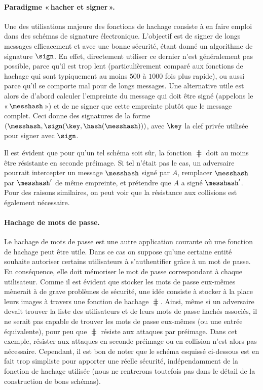 \paragraph{Paradigme «\,hacher et signer\,».}
Une des utilisations majeure des fonctions de hachage consiste à en faire emploi dans des schémas de signature électronique.
L'objectif est de signer de longs messages efficacement et avec une bonne sécurité, étant donné un algorithme de signature
$\sign$. En effet, directement utiliser ce dernier n'est généralement pas possible, parce qu'il est trop lent (particulièrement
comparé aux fonctions de hachage qui sont typiquement au moins $500$ à $1000$ fois plus rapide), ou aussi parce qu'il se comporte mal
pour de longs messages. Une alternative utile est alors de d'abord calculer l'empreinte du message
qui doit être signé
(appelons le «\,$\messhash$\,») et de ne signer que cette empreinte plutôt que le message complet.
Ceci donne des signatures de la forme $(\messhash, \sign(\key,\hash(\messhash)))$, avec $\key$ la clef privée utilisée pour signer avec $\sign$. 

Il est évident que pour qu'un tel schéma soit sûr, la fonction $\hash$ doit au moins être résistante en seconde préimage. Si tel n'était pas le cas, un adversaire
pourrait intercepter un message $\messhash$ signé par $A$, remplacer $\messhash$ par $\messhash'$ de même empreinte, et prétendre que $A$ a signé $\messhash'$.
Pour des raisons similaires, on peut voir que la résistance aux collisions est également nécessaire.

\paragraph{Hachage de mots de passe.} Le hachage de mots de passe est une autre application courante où une fonction
de hachage peut être utile. Dans ce cas
on suppose qu'une certaine entité souhaite autoriser certains utilisateurs à s'authentifier grâce à un mot de passe.
En conséquence, elle doit mémoriser le mot de passe correspondant à chaque utilisateur. Comme il est évident que stocker les mots
de passe eux-mêmes mènerait à de grave problèmes de sécurité, une idée consiste à stocker à la place leurs images à travers une fonction
de hachage $\hash$. Ainsi, même si un adversaire devait trouver la liste des utilisateurs et de leurs mots de passe hachés associés, il ne serait
pas capable de trouver les mots de passe eux-mêmes (ou une entrée équivalente), pour peu que $\hash$ résiste aux attaques par préimage.
Dans cet exemple, résister aux attaques en seconde préimage ou en collision n'est alors pas nécessaire. Cependant, il est bon de noter
que le schéma esquissé ci-dessous est en fait trop simpliste pour apporter une réelle sécurité, indépendamment de la fonction de hachage
utilisée (nous ne rentrerons toutefois pas dans le détail de la construction de bons schémas).

